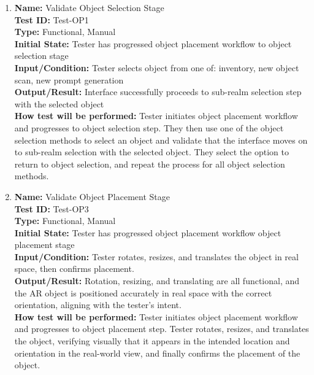 \documentclass[12pt, titlepage]{article}
\begin{document}
\begin{enumerate}


  \item \textbf{Name:} Validate Object Selection Stage \label{itm:Test-OP1} \\
        \textbf{Test ID:} Test-OP1 \\
        \textbf{Type:} Functional, Manual \\
        \textbf{Initial State:} Tester has progressed object placement workflow to object selection stage \\
        \textbf{Input/Condition:} Tester selects object from one of: inventory, new object scan, new prompt generation \\
        \textbf{Output/Result:} Interface successfully proceeds to sub-realm selection step with the selected object \\
        \textbf{How test will be performed:} Tester initiates object placement workflow and progresses to object selection step. They then use one of the object selection methods to select an object and validate that the interface moves on to sub-realm selection with the selected object. They select the option to return to object selection, and repeat the process for all object selection methods.

  \item \textbf{Name:} Validate Object Placement Stage \label{itm:Test-OP3} \\
        \textbf{Test ID:} Test-OP3 \\
        \textbf{Type:} Functional, Manual \\
        \textbf{Initial State:} Tester has progressed object placement workflow object placement stage \\
        \textbf{Input/Condition:} Tester rotates, resizes, and translates the object in real space, then confirms placement. \\
        \textbf{Output/Result:} Rotation, resizing, and translating are all functional, and the AR object is positioned accurately in real space with the correct orientation, aligning with the tester's intent. \\
        \textbf{How test will be performed:} Tester initiates object placement workflow and progresses to object placement step. Tester rotates, resizes, and translates the object, verifying visually that it appears in the intended location and orientation in the real-world view, and finally confirms the placement of the object.


\end{enumerate}
\end{document}
